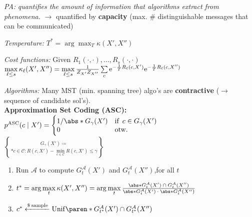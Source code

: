 \emph{PA:}\enskip
\textit{quantifies the amount of information that algorithms extract from phenomena.}
$\to$ quantified by \textbf{capacity} (max. \# distinguishable messages that can be communicated)

\emph{Temperature:}\enspace
$T^\ast = \arg\max_T \kappa(X',X'')$

\emph{Cost functions:}\enspace
Given $R_1(\cdot,\cdot),\ldots,R_s(\cdot,\cdot)$\\
$\max\limits_{\ell\leq s} \kappa_\ell(X',X'') = \max\limits_{\ell\leq s} \frac{1}{Z_{X'} Z_{X''}} \sum\limits_c \mathrm{e}^{-\frac1T R_\ell(c,X')} \mathrm{e}^{-\frac1T R_\ell(c,X'')}$

\emph{Algorithms:}\enspace
Many MST (min. spanning tree) algo's are \textbf{contractive} ($\to$ sequence of candidate sol's).
\\
\textbf{Approximation Set Coding (ASC):}\\
\quad $p\ap{ASC}(c\mid X') = \begin{cases}
    1 / \abs*{G_\gamma(X')}  & \text{if}\enspace c\in G_\gamma(X') \\[-2pt]
    0   & \text{otw.}
\end{cases}$\\
\quad $G_\gamma(X') \coloneqq \brace*{ c\in\mathcal C : R(c,X') - \min\limits_{c\in\mathcal C} R(c,X') \leq \gamma }$
\begin{enumerate}
    \item Run $\mathcal A$ to compute $G_t^{\mathcal A}(X')$ and $G_t^{\mathcal A}(X'')$,\enspace for all $t$
    \vspace{2pt}
    \item $t^\ast = \arg\max\limits_t \kappa(X',X'')
        = \arg\max\limits_t \frac{\abs*{G_t^{\mathcal A}(X') \:\cap\: G_t^{\mathcal A}(X'')}}{\abs*{G_t^{\mathcal A}(X')} \:\cdot\: \abs*{G_t^{\mathcal A}(X'')}}$
    \item $c^\ast \xleftarrow{\$\:\text{sample}} \mathrm{Unif}\paren*{G_{t^\ast}^{\mathcal A}(X') \cap G_{t^\ast}^{\mathcal A}(X'')}$
\end{enumerate}



